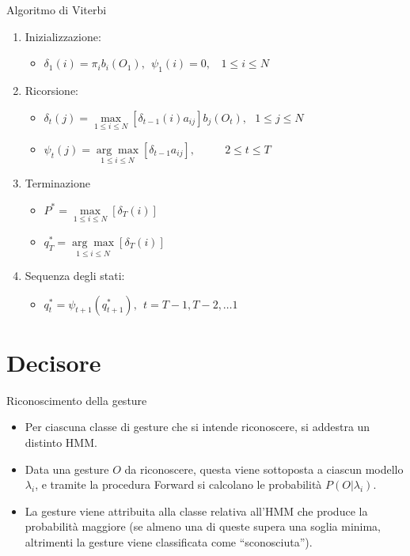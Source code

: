 \documentclass[slidestop,mathserif,red]{beamer}
\begin{document}
\begin{frame}
\begin{block}{Algoritmo di Viterbi}
\begin{enumerate}
\item Inizializzazione:
	\begin{itemize}
 	\item $\delta_{1}(i)=\pi_{i}b_{i}(O_{1}),\ \ \psi_{1}(i)=0,\ \ \ \ 1\leq i \leq N$  
	\end{itemize}
\item Ricorsione:
	\begin{itemize}
 	\item $\delta_{t}(j)=\underset{1\leq i \leq N}{\max}[\delta_{t-1}(i)a_{ij}]b_{j}(O_{t}),\ \ \ 1\leq j \leq N$
	\item $\psi_{t}(j)=\underset{1\leq i \leq N}{\arg\max}[\delta_{t-1}a_{ij}],\ \ \ \ \ \ \ \ \ \ \ \ 2\leq t \leq T$
	\end{itemize}
\item Terminazione
	\begin{itemize}
 	\item $P^*=\underset{1\leq i \leq N}{\max}[\delta_{T}(i)]$
	\item $q_{T}^*=\underset{1\leq i \leq N}{\arg\max}[\delta_{T}(i)]$
	\end{itemize}
\item Sequenza degli stati:
	\begin{itemize}
 	\item $q_{t}^*=\psi_{t+1}(q_{t+1}^*),\ \ t = T-1,T-2,\ldots1$
	\end{itemize}
\end{enumerate}
\end{block}
\end{frame}

\section{Decisore}

\begin{frame}{Riconoscimento della gesture}
\begin{block}{}
\begin{itemize}
 \item Per ciascuna classe di gesture che si intende riconoscere, si addestra un distinto HMM.
 \item Data una gesture $O$ da riconoscere, questa viene sottoposta a ciascun modello $\lambda_{i}$, e tramite la procedura Forward si calcolano le probabilit\`a $P(O|\lambda_{i})$.
 \item La gesture viene attribuita alla classe relativa all'HMM che produce la probabilit\`a maggiore (se almeno una di queste supera una soglia minima, altrimenti la gesture viene classificata come ``sconosciuta'').
\end{itemize}

\end{block}
\end{frame}
\end{document}
